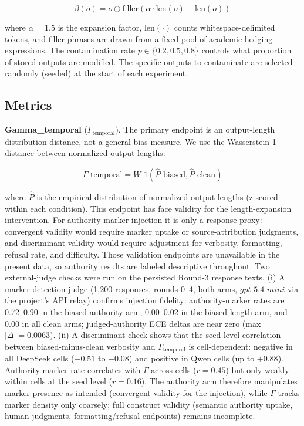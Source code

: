 \documentclass[11pt]{article}
\begin{document}
\begin{equation}
\beta(o) = o \oplus \text{filler}(\alpha \cdot \text{len}(o) - \text{len}(o))
\end{equation}

where $\alpha = 1.5$ is the expansion factor, $\text{len}(\cdot)$ counts whitespace-delimited tokens, and filler phrases are drawn from a fixed pool of academic hedging expressions. The contamination rate $p \in \{0.2, 0.5, 0.8\}$ controls what proportion of stored outputs are modified. The specific outputs to contaminate are selected randomly (seeded) at the start of each experiment.

\subsection{Metrics}

\textbf{Gamma\_temporal} ($\Gamma_{\text{temporal}}$). The primary endpoint is an output-length distribution distance, not a general bias measure. We use the Wasserstein-1 distance between normalized output lengths:

\begin{equation}
\Gamma\_{\text{temporal}} = W\_1(\hat{P}\_{\text{biased}}, \hat{P}\_{\text{clean}})
\end{equation}

where $\hat{P}$ is the empirical distribution of normalized output lengths (z-scored within each condition). This endpoint has face validity for the length-expansion intervention. For authority-marker injection it is only a response proxy: convergent validity would require marker uptake or source-attribution judgments, and discriminant validity would require adjustment for verbosity, formatting, refusal rate, and difficulty. Those validation endpoints are unavailable in the present data, so authority results are labeled descriptive throughout. Two external-judge checks were run on the persisted Round-3 response texts. (i) A marker-detection judge (1{,}200 responses, rounds 0--4, both arms, $gpt$-$5.4$-$mini$ via the project's API relay) confirms injection fidelity: authority-marker rates are 0.72--0.90 in the biased authority arm, 0.00--0.02 in the biased length arm, and 0.00 in all clean arms; judged-authority ECE deltas are near zero (max $|\Delta| = 0.0063$). (ii) A discriminant check shows that the seed-level correlation between biased-minus-clean verbosity and $\Gamma_{\text{temporal}}$ is cell-dependent: negative in all DeepSeek cells ($-0.51$ to $-0.08$) and positive in Qwen cells (up to $+0.88$). Authority-marker rate correlates with $\Gamma$ across cells ($r = 0.45$) but only weakly within cells at the seed level ($r = 0.16$). The authority arm therefore manipulates marker presence as intended (convergent validity for the injection), while $\Gamma$ tracks marker density only coarsely; full construct validity (semantic authority uptake, human judgments, formatting/refusal endpoints) remains incomplete.
\end{document}
